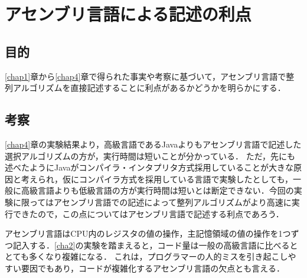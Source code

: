 \chapter{アセンブリ言語による記述の利点}
\section{目的}
\ref{chap1}章から\ref{chap4}章で得られた事実や考察に基づいて，アセンブリ言語で整列アルゴリズムを直接記述することに利点があるかどうかを明らかにする．
\section{考察}
\ref{chap4}章の実験結果より，高級言語である{\ttfamily Java}よりもアセンブリ言語で記述した選択アルゴリズムの方が，実行時間は短いことが分かっている．
ただ，先にも述べたように{\ttfamily Java}がコンパイラ・インタプリタ方式採用していることが大きな原因と考えられ，仮にコンパイラ方式を採用している言語で実験したとしても，一般に高級言語よりも低級言語の方が実行時間は短いとは断定できない．今回の実験に限ってはアセンブリ言語での記述によって整列アルゴリズムがより高速に実行できたので，この点についてはアセンブリ言語で記述する利点であろう．\par
アセンブリ言語はCPU内のレジスタの値の操作，主記憶領域の値の操作を1つずつ記入する．\ref{cha2}の実験を踏まえると，コード量は一般の高級言語に比べるととても多くなり複雑になる．
これは，プログラマーの人的ミスを引き起こしやすい要因でもあり，コードが複雑化するアセンブリ言語の欠点とも言える．
